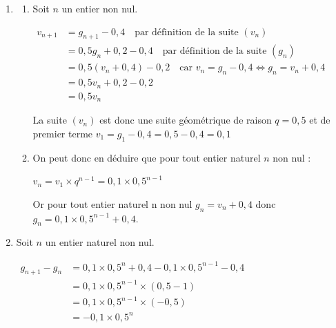 \begin{enumerate}
\begin{enumerate}
$\begin{aligned} g_{n+1}=P(G_{n+1}) &= P(G_n\cap G_{n+1}) + P(D_n \cap G_{n+1})\\
&= g_n\times 0,7 +(1-g_n)\times 0,2 \\
&= 0,7g_n+0,2- 0,2g_n\\
&= 0,5g_n+0,2\end{aligned}$

On arrive bien au résultat annoncé.

	\end{enumerate}
	\item
	\begin{enumerate}
		\item  Soit $n$ un entier non nul.

		$\begin{aligned} v_{n+1}& = g_{n+1}-0,4 \quad \text{par définition de la suite } \left(v_n\right)\\
		&= 0,5g_n+0,2-0,4 \quad \text{par définition de la suite } \left(g_n\right)\\
		&= 0,5 ( v_n+0,4) -0,2 \quad \text{car } v_n=g_n-0,4 \iff g_n=v_n+0,4\\
		&= 0,5 v_n +0,2-0,2\\
		&=0,5v_n\end{aligned}$

		La suite $ \left(v_n\right)$ est donc une suite géométrique de raison $q = 0,5$ et de premier terme \linebreak$v_1 = g_1 - 0,4 = 0,5 - 0,4 = 0,1$


		\item  On peut donc en déduire que pour tout entier naturel $n$ non nul :

		$v_n=v_1\times q^{n-1}= 0,1 \times 0,5^{n-1}$

		Or pour tout entier naturel n non nul \quad $g_n=v_n+0,4$ \quad donc \quad $g_n=0,1 \times 0,5^{n-1}+0,4$.

	\end{enumerate}
	\item   Soit $n$ un entier naturel non nul.

	$\begin{aligned} g_{n+1}-g_{n}&=0,1 \times 0,5^{n}+0,4-0,1 \times 0,5^{n-1}-0,4\\
	&= 0,1 \times 0,5^{n-1} \times ( 0,5-1)\\
	&= 0,1 \times 0,5^{n-1} \times (-0,5)\\
	&= -0,1 \times 0,5^n\end{aligned}$


\end{enumerate}
